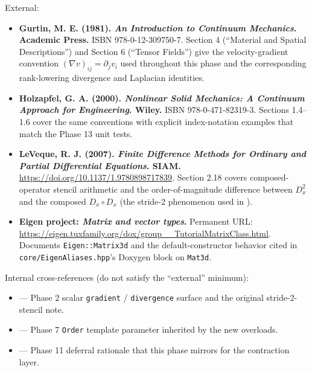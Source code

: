 External:

\begin{itemize}
\tightlist
\item
  \textbf{Gurtin, M. E. (1981). \emph{An Introduction to Continuum
  Mechanics}. Academic Press.} ISBN 978-0-12-309750-7.
  Section 4 (``Material and Spatial Descriptions'') and Section 6
  (``Tensor Fields'') give the velocity-gradient convention
  \((\nabla v)_{ij} = \partial_j v_i\) used throughout this phase
  and the corresponding rank-lowering divergence and Laplacian
  identities.
\item
  \textbf{Holzapfel, G. A. (2000). \emph{Nonlinear Solid Mechanics:
  A Continuum Approach for Engineering}. Wiley.} ISBN
  978-0-471-82319-3. Sections 1.4--1.6 cover the same conventions
  with explicit index-notation examples that match the Phase 13 unit
  tests.
\item
  \textbf{LeVeque, R. J. (2007). \emph{Finite Difference Methods for
  Ordinary and Partial Differential Equations}. SIAM.}
  \url{https://doi.org/10.1137/1.9780898717839}. Section 2.18 covers
  composed-operator stencil arithmetic and the order-of-magnitude
  difference between
  \(D_x^2\) and the composed
  \(D_x \circ D_x\) (the stride-2 phenomenon used in
  ).
\item
  \textbf{Eigen project: \emph{Matrix and vector types}.} Permanent
  URL:
  \url{https://eigen.tuxfamily.org/dox/group__TutorialMatrixClass.html}.
  Documents \passthrough{\lstinline!Eigen::Matrix3d!} and the
  default-constructor behavior cited in
  \passthrough{\lstinline!core/EigenAliases.hpp!}'s Doxygen block on
  \passthrough{\lstinline!Mat3d!}.
\end{itemize}

Internal cross-references (do not satisfy the ``external'' minimum):

\begin{itemize}
\tightlist
\item
   — Phase 2 scalar
  \passthrough{\lstinline!gradient!} /
  \passthrough{\lstinline!divergence!} surface and the original
  stride-2-stencil note.
\item
   — Phase 7
  \passthrough{\lstinline!Order!} template parameter inherited by the
  new overloads.
\item
   — Phase 11 deferral
  rationale that this phase mirrors for the contraction layer.
\end{itemize}
